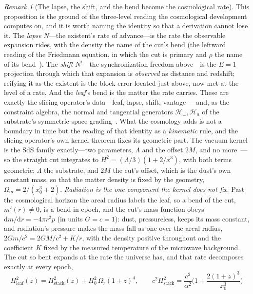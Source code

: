 \documentclass[11pt,a4paper]{article}
\theoremstyle{plain}
\theoremstyle{definition}
\theoremstyle{remark}
\newtheorem{remark}{Remark}
\newcommand{\dd}{\mathrm{d}}
\begin{document}
\begin{remark}[The lapse, the shift, and the bend become the cosmological rate]
This proposition is the ground of the three-level reading the cosmological development computes on, and it is worth naming the identity so that a derivation cannot lose it. The \emph{lapse} $N$---the existent's rate of advance---is the rate the observable expansion rides, with the density the name of the cut's bend (the leftward reading of the Friedmann equation, in which the cut is primary and $\rho$ the name of its bend~\cite{JanzenOperator}). The \emph{shift} $N^i$---the synchronization freedom above---is the $E{=}1$ projection through which that expansion is \emph{observed} as distance and redshift; reifying it as the existent is the block error located just above, now met at the level of a rate. And the \emph{leaf}'s bend is the matter the rate carries. These are exactly the slicing operator's data---leaf, lapse, shift, vantage~\cite{JanzenOperator}---and, as the constraint algebra, the normal and tangential generators $\mathcal H_\perp,\mathcal H_a$ of the substrate's symmetric-space grading~\cite{JanzenAlgebroid}. What the cosmology adds is not a boundary in time but the reading of that identity as a \emph{kinematic} rule, and the slicing operator's own kernel theorem fixes its geometric part. The vacuum kernel is the SdS family exactly---two parameters, $\Lambda$ and the offset $2M$, and no more~\cite{JanzenOperator}---so the straight cut integrates to $H^{2}=(\Lambda/3)(1+2/x^{3})$, with both terms geometric: $\Lambda$ the substrate, and $2M$ the cut's offset, which is the dust's own constant mass, so that the matter density is fixed by the geometry, $\Omega_m=2/(x_0^{3}+2)$. \emph{Radiation is the one component the kernel does not fix.} Past the cosmological horizon the areal radius labels the leaf, so a bend of the cut, $m'(r)\neq0$, is a bend in epoch, and the cut's mass function obeys $\dd m/\dd r=-4\pi r^{2}p$ (in units $G=c=1$): dust, pressureless, keeps its mass constant, and radiation's pressure makes the mass fall as one over the areal radius, $2Gm/c^{2}=2GM/c^{2}+K/r$, with the density positive throughout and the coefficient $K$ fixed by the measured temperature of the microwave background. The cut so bent expands at the rate the universe has, and that rate decomposes exactly at every epoch,
\begin{equation}\label{eq:two-rate}
H_{\text{leaf}}^{2}(z)=H_{\text{stack}}^{2}(z)+H_0^{2}\,\Omega_r(1+z)^{4},
\qquad
c^{2}H_{\text{stack}}^{2}=\frac{c^{2}}{\alpha^{2}}\Big(1+\frac{2(1+z)^{3}}{x_0^{3}}\Big)

\end{equation}
\end{remark}
\end{document}
